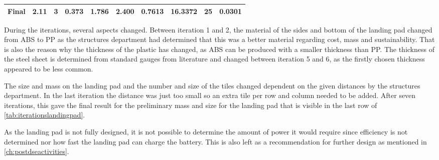 \begin{table}[h]
{\begin{tabular}{|l|l|l|l|l|l|l|l|l|l|}
\rowcolor[HTML]{DAE8FC} 
\textbf{Final}                           & 2.11                                                                                     & 3                                                                                                    & 0.373                                                                                                    & {\color[HTML]{444444} 1.786}                                                                            & 2.400                                                                                           & 0.7613                                                                                            & 16.3372                                                                                      & 25                                                                                    & 0.0301                                                                                     \\ \hline
\end{tabular}%
}
\end{table}

During the iterations, several aspects changed. Between iteration 1 and 2, the material of the sides and bottom of the landing pad changed from ABS to PP as the structures department had determined that this was a better material regarding cost, mass and sustainability. That is also the reason why the thickness of the plastic has changed, as ABS can be produced with a smaller thickness than PP. The thickness of the steel sheet is determined from standard gauges from literature \cite{steelthickness} and changed between iteration 5 and 6, as the firstly chosen thickness appeared to be less common.

The size and mass on the landing pad and the number and size of the tiles changed dependent on the given distances by the structures department. In the last iteration the distance was just too small so an extra tile per row and column needed to be added.
After seven iterations, this gave the final result for the preliminary mass and size for the landing pad that is visible in the last row of \autoref{tab:iterationslandingpad}. 

As the landing pad is not fully designed, it is not possible to determine the amount of power it would require since efficiency is not determined nor how fast the landing pad can charge the battery. This is also left as a recommendation for further design as mentioned in \autoref{ch:postdseactivities}.  


